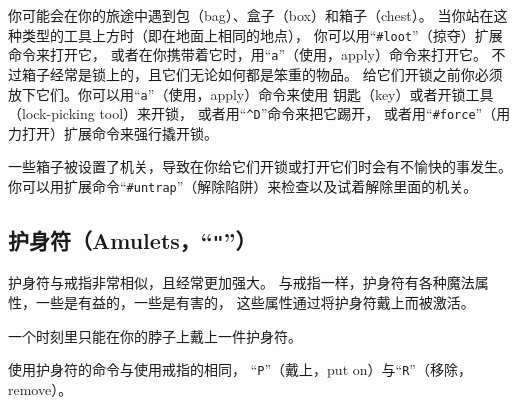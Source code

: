 \documentclass[a4paper, 10pt]{article}
\begin{document}
你可能会在你的旅途中遇到包（bag）、盒子（box）和箱子（chest）。
当你站在这种类型的工具上方时（即在地面上相同的地点），
你可以用“{\tt \#loot}”（掠夺）扩展命令来打开它，
或者在你携带着它时，用“{\tt a}”（使用，apply）命令来打开它。
不过箱子经常是锁上的，且它们无论如何都是笨重的物品。
给它们开锁之前你必须放下它们。你可以用“{\tt a}”（使用，apply）命令来使用
钥匙（key）或者开锁工具（lock-picking tool）来开锁，
或者用“{\tt \^{}D}”命令来把它踢开，
或者用“{\tt \#force}”（用力打开）扩展命令来强行撬开锁。

一些箱子被设置了机关，导致在你给它们开锁或打开它们时会有不愉快的事发生。
你可以用扩展命令“{\tt \#untrap}”（解除陷阱）来检查以及试着解除里面的机关。

\subsection*{护身符（Amulets，“{\tt "}”）}

护身符与戒指非常相似，且经常更加强大。
与戒指一样，护身符有各种魔法属性，一些是有益的，一些是有害的，
这些属性通过将护身符戴上而被激活。

一个时刻里只能在你的脖子上戴上一件护身符。

使用护身符的命令与使用戒指的相同，
“{\tt P}”（戴上，put on）与“{\tt R}”（移除，remove）。
\end{document}
